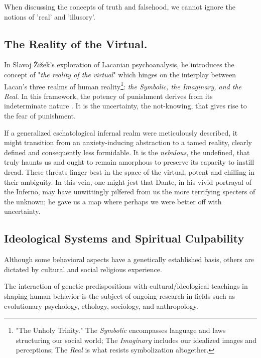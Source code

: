 \documentclass[11pt,a4]{article}
\begin{document}
When discussing the concepts of truth and falsehood, we cannot
ignore the notions of 'real' and 'illusory'.


 \subsection{The Reality of the Virtual.} \label{reality}

        In Slavoj Žižek's exploration of Lacanian psychoanalysis, he introduces
        the concept of "\textit{the reality of the virtual}" which hinges on the interplay between
        Lacan's three realms of human reality\footnote{"The Unholy Trinity." The \textit{Symbolic} encompasses language and laws structuring our social world; The \textit{Imaginary} includes our idealized images and perceptions; The \textit{Real} is what resists symbolization altogether.}: \textit{the Symbolic, the Imaginary, and the Real}\cite{lacan1981four}.
        In this framework, the potency of punishment derives from its indeterminate
        nature \cite{Borretzen2012-tx}. It is the uncertainty, the not-knowing, that gives rise
        to the fear of punishment.







        If a generalized eschatological infernal realm were meticulously described, it might transition
        from an anxiety-inducing abstraction to a tamed reality, clearly defined and consequently less
        formidable. It is the \textit{nebulous}, the undefined, that truly haunts us and ought to remain
        amorphous to preserve its capacity to instill dread. These threats linger best in the space of
        the virtual, potent and chilling in their ambiguity. In this vein, one might jest that Dante,
        in his vivid portrayal of the Inferno, may have unwittingly pilfered from us the more terrifying
        specters of the unknown; he gave us a map where perhaps we were better off with uncertainty.


    \subsection{Ideological Systems and Spiritual Culpability} \label{religion}

    Although some behavioral aspects have a genetically established basis, others are dictated by cultural and social religious experience.

    The interaction of genetic predispositions with cultural/ideological teachings in shaping human behavior is the subject of ongoing research in fields such as evolutionary psychology, ethology, sociology, and anthropology.
\end{document}
